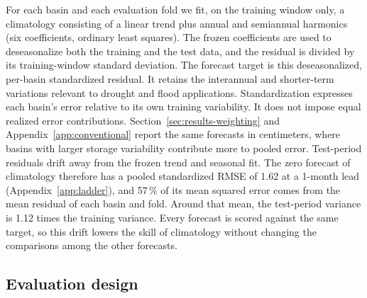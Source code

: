 \documentclass[hess, manuscript]{copernicus}
\begin{document}
For each basin and each evaluation fold we fit, on the training window
only, a climatology consisting of a linear trend plus annual and
semiannual harmonics (six coefficients, ordinary least squares). The
frozen coefficients are used to deseasonalize both the training and the
test data, and the residual is divided by its training-window standard
deviation. The forecast target is this deseasonalized, per-basin
standardized residual. It retains the interannual and shorter-term
variations relevant to drought and flood applications. Standardization expresses each
basin's error relative to its own training variability. It does not impose
equal realized error contributions. Section~\ref{sec:results-weighting} and
Appendix~\ref{app:conventional} report the same forecasts in centimeters,
where basins with larger storage variability contribute more to pooled error.
Test-period residuals drift away from the frozen trend and seasonal fit.
The zero forecast of climatology therefore has a pooled standardized RMSE
of 1.62 at a 1-month lead (Appendix~\ref{app:ladder}), and 57\,\% of its
mean squared error comes from the mean residual of each basin and fold.
Around that mean, the test-period variance is 1.12 times the training
variance. Every forecast is scored against the same target, so this drift
lowers the skill of climatology without changing the comparisons among
the other forecasts.

\subsection{Evaluation design}
\label{sec:methods-folds}
\end{document}
